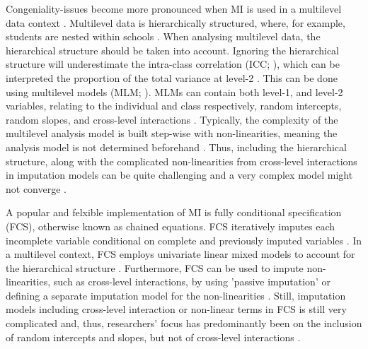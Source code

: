 \documentclass[10pt, a4paper, titlepage]{article}
\begin{document}
Congeniality-issues become more pronounced when MI is used in a multilevel data context \citep{mistlerComparisonJointModel2017, enders2018, enders2018a, enders2020, buurenFlexibleImputationMissing2018, taljaard2008, enders2016, resche-rigon2018, audigier2018, dong2023, grund2016, grund2018a, grund2018, ludtke2017, grund2021, quartagno2022}. Multilevel data is hierarchically structured, where, for example, students are nested within schools \citep{hox2017, hox2011}. When analysing multilevel data, the hierarchical structure should be taken into account. Ignoring the hierarchical structure will underestimate the intra-class correlation (ICC; \citealt{buurenFlexibleImputationMissing2018, ludtke2017, taljaard2008, hox2011}), which can be interpreted the proportion of the total variance at level-2 \citep{gulliford2005, shieh2012, hox2011}. This can be done using multilevel models (MLM; \citealt{hox2017, hox2011, ludtke2017}). MLMs can contain both level-1, and level-2 variables, relating to the individual and class respectively, random intercepts, random slopes, and cross-level interactions \citep{hox2017, hox2011}. Typically, the complexity of the multilevel analysis model is built step-wise with non-linearities, meaning the analysis model is not determined beforehand \citep{hox2017, hox2011}. Thus, including the hierarchical structure, along with the complicated non-linearities from cross-level interactions in imputation models can be quite challenging  \citep{buurenFlexibleImputationMissing2018, burgette2010, hox2011} and a very complex model might not converge \citep{buurenFlexibleImputationMissing2018}.

A popular and felxible implementation of MI is fully conditional specification (FCS), otherwise known as chained equations\citep{audigier2018, burgette2010, vanbuuren2007, grund2018a}. FCS iteratively imputes each incomplete variable conditional on complete and previously imputed variables \citep{mistlerComparisonJointModel2017, buurenFlexibleImputationMissing2018, enders2016, enders2018, enders2018a, hughes2014, grund2018a}. In a multilevel context, FCS employs univariate linear mixed models to account for the hierarchical structure \citep{mistlerComparisonJointModel2017, enders2018, resche-rigon2018}. Furthermore, FCS can be used to impute non-linearities, such as cross-level interactions, by using 'passive imputation' or defining a separate imputation model for the non-linearities \citep{buurenFlexibleImputationMissing2018, grund2018}. Still, imputation models including cross-level interaction or non-linear terms in FCS is still very complicated \citep{grund2021, grund2018} and, thus, researchers' focus has predominantly been on the inclusion of random intercepts and slopes, but not of cross-level interactions \citep{grund2018a, grund2016, enders2018, enders2018a, enders2020, enders2016}.
\end{document}
